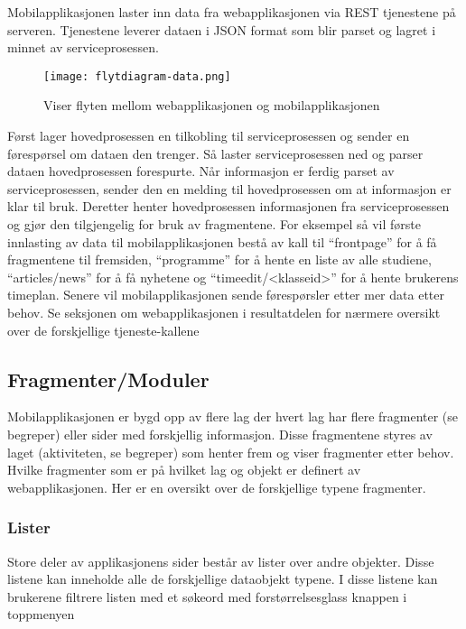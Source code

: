 \documentclass[../main.tex]{subfiles}
\begin{document}
Mobilapplikasjonen laster inn data fra webapplikasjonen via REST tjenestene på serveren. Tjenestene leverer dataen i JSON format som blir parset og lagret i minnet av serviceprosessen.

\begin{figure}[H]
  \centering
  \texttt{[image: flytdiagram-data.png]}
  \caption{Viser flyten mellom webapplikasjonen og mobilapplikasjonen}
\end{figure}

Først lager hovedprosessen en tilkobling til serviceprosessen og sender en førespørsel om dataen den trenger. Så laster serviceprosessen ned og parser dataen hovedprosessen forespurte. Når informasjon er ferdig parset av serviceprosessen, sender den en melding til hovedprosessen om at informasjon er klar til bruk. Deretter henter hovedprosessen informasjonen fra serviceprosessen og gjør den tilgjengelig for bruk av fragmentene.\newline
For eksempel så vil første innlasting av data til mobilapplikasjonen bestå av kall til “frontpage” for å få fragmentene til fremsiden, “programme” for å hente en liste av alle studiene, “articles/news” for å få nyhetene og “timeedit/<klasseid>” for å hente brukerens timeplan. Senere vil mobilapplikasjonen sende førespørsler etter mer data etter behov. Se seksjonen om webapplikasjonen i resultatdelen for nærmere oversikt over de forskjellige tjeneste-kallene

\subsection{Fragmenter/Moduler}

Mobilapplikasjonen er bygd opp av flere lag der hvert lag har flere fragmenter (se begreper) eller sider med forskjellig informasjon. Disse fragmentene styres av laget (aktiviteten, se begreper) som henter frem og viser fragmenter etter behov. Hvilke fragmenter som er på hvilket lag og objekt er definert av webapplikasjonen. Her er en oversikt over de forskjellige typene fragmenter.

\subsubsection{Lister}

Store deler av applikasjonens sider består av lister over andre objekter. Disse listene kan inneholde alle de forskjellige dataobjekt typene. I disse listene kan brukerene filtrere listen med et søkeord med forstørrelsesglass knappen i toppmenyen
\end{document}
